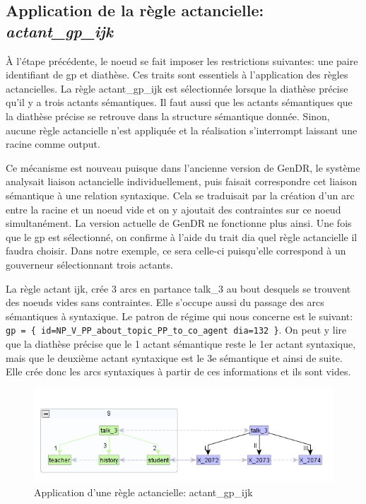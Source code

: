 \subsection{Application de la règle actancielle: \emph{actant\_gp\_ijk}}
À l'étape précédente, le noe{}ud  se fait imposer les restrictions suivantes: une paire identifiant de gp et diathèse. Ces traits sont essentiels à l'application des règles actancielles. La règle actant\_gp\_ijk est sélectionnée lorsque la diathèse précise qu'il y a trois actants sémantiques. Il faut aussi que les actants sémantiques que la diathèse précise se retrouve dans la structure sémantique donnée. Sinon, aucune règle actancielle n'est appliquée et la réalisation s'interrompt laissant une racine comme output. 

Ce mécanisme est nouveau puisque dans l'ancienne version de GenDR, le système analysait liaison actancielle individuellement, puis faisait correspondre cet liaison sémantique à une relation syntaxique. Cela se traduisait par la création d'un arc entre la racine et un noe{}ud vide et on y ajoutait des contraintes sur ce noe{}ud simultanément. La version actuelle de GenDR ne fonctionne plus ainsi. Une fois que le gp est sélectionné, on confirme à l'aide du trait dia quel règle actancielle il faudra choisir. Dans notre exemple, ce sera celle-ci puisqu'elle correspond à un gouverneur sélectionnant trois actants.

La règle actant ijk, crée 3 arcs en partance talk\_3 au bout desquels se trouvent des noe{}uds vides sans contraintes. Elle s'occupe aussi du passage des arcs sémantiques à syntaxique. Le patron de régime qui nous concerne est le suivant: \lstinline!gp = { id=NP_V_PP_about_topic_PP_to_co_agent dia=132 }!. On peut y lire que la diathèse précise que le 1 actant sémantique reste le 1er actant syntaxique, mais que le deuxième actant syntaxique est le 3e sémantique et ainsi de suite. Elle crée donc les arcs syntaxiques à partir de ces informations et ils sont vides.

\begin{figure}[htb]
	\centering
	\includegraphics[width=1\textwidth, trim = {0cm 0cm 0cm 0cm},clip]{ch6/figs/actant_gp_ijk.png}
	\caption{Application d'une règle actancielle: actant\_gp\_ijk}
	\label{deroulement2}
\end{figure}

